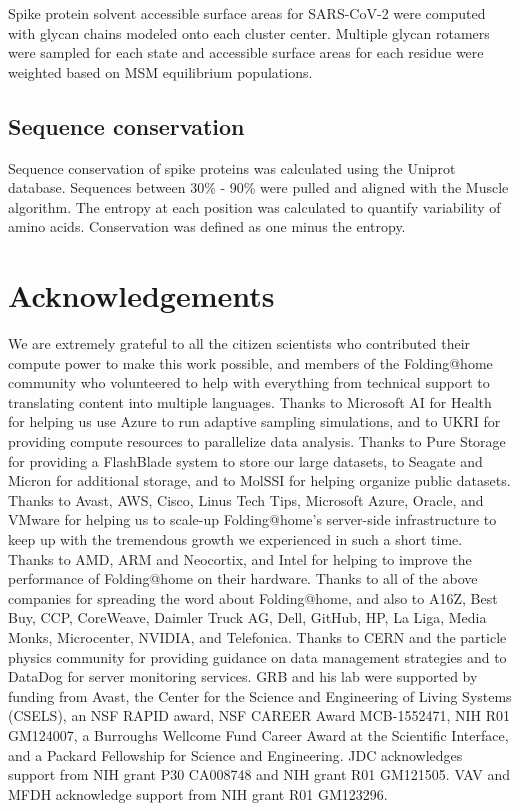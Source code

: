 \documentclass[../main.tex]{subfiles}
\begin{document}
        Spike protein solvent accessible surface areas for SARS-CoV-2 were computed with glycan chains modeled onto each cluster center. Multiple glycan rotamers were sampled for each state and accessible surface areas for each residue were weighted based on MSM equilibrium populations.

    \subsection{Sequence conservation}
        Sequence conservation of spike proteins was calculated using the Uniprot database\cite{the_uniprot_consortium_uniprot:_2019}. Sequences between 30\% - 90\% were pulled and aligned with the Muscle algorithm\cite{edgar_muscle:_2004}. The entropy at each position was calculated to quantify variability of amino acids. Conservation was defined as one minus the entropy\cite{Shannon:1948iy}.

    \section{Acknowledgements}
        We are extremely grateful to all the citizen scientists who contributed their compute power to make this work possible, and members of the Folding@home community who volunteered to help with everything from technical support to translating content into multiple languages. Thanks to Microsoft AI for Health for helping us use Azure to run adaptive sampling simulations, and to UKRI for providing compute resources to parallelize data analysis. Thanks to Pure Storage for providing a FlashBlade system to store our large datasets, to Seagate and Micron for additional storage, and to MolSSI for helping organize public datasets. Thanks to Avast, AWS, Cisco, Linus Tech Tips, Microsoft Azure, Oracle, and VMware for helping us to scale-up Folding@home’s server-side infrastructure to keep up with the tremendous growth we experienced in such a short time. Thanks to AMD, ARM and Neocortix, and Intel for helping to improve the performance of Folding@home on their hardware. Thanks to all of the above companies for spreading the word about Folding@home, and also to A16Z, Best Buy, CCP, CoreWeave, Daimler Truck AG, Dell, GitHub, HP, La Liga, Media Monks, Microcenter, NVIDIA, and Telefonica. Thanks to CERN and the particle physics community for providing guidance on data management strategies and to DataDog for server monitoring services. GRB and his lab were supported by funding from Avast, the Center for the Science and Engineering of Living Systems (CSELS), an NSF RAPID award, NSF CAREER Award MCB-1552471, NIH R01 GM124007, a Burroughs Wellcome Fund Career Award at the Scientific Interface, and a Packard Fellowship for Science and Engineering. JDC acknowledges support from NIH grant P30 CA008748 and NIH grant R01 GM121505. VAV and MFDH acknowledge support from NIH grant R01 GM123296.
\end{document}
